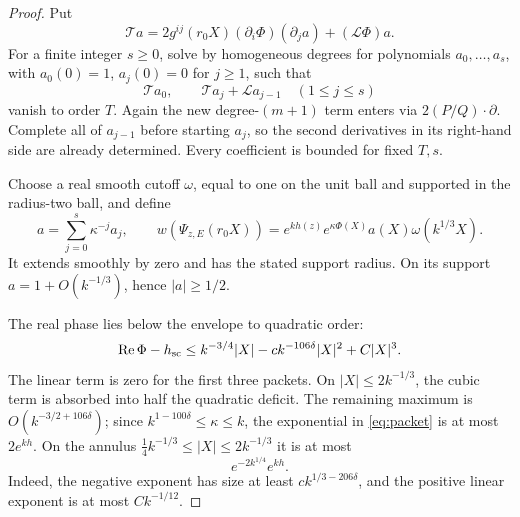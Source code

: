 \begin{proof}
Put
\[
 \mathcal T a=2g^{ij}(r_0X)(\partial_i\Phi)(\partial_j a)
                          +(\mathcal L\Phi)a.
\]
For a finite integer \(s\ge0\), solve by homogeneous degrees for
polynomials \(a_0,\ldots,a_s\), with \(a_0(0)=1\), \(a_j(0)=0\)
for \(j\ge1\), such that
\[
 \mathcal T a_0,\qquad
 \mathcal T a_j+\mathcal L a_{j-1}\quad(1\le j\le s)
\]
vanish to order \(T\).
Again the new degree-\((m+1)\) term enters via
\(2(P/Q)\cdot\partial\). Complete all of \(a_{j-1}\) before
starting \(a_j\), so the second derivatives in its right-hand side
are already determined. Every coefficient is bounded for fixed \(T,s\).

Choose a real smooth cutoff \(\omega\), equal to one on the unit
ball and supported in the radius-two ball, and define
\begin{equation}\label{eq:packet}
 a=\sum_{j=0}^s\kappa^{-j}a_j,\qquad
 w(\Psi_{z,E}(r_0X))=
 e^{kh(z)}e^{\kappa\Phi(X)}a(X)\omega(k^{1/3}X).
\end{equation}
It extends smoothly by zero and has the stated support radius.
On its support \(a=1+O(k^{-1/3})\), hence \(|a|\ge1/2\).

The real phase lies below the envelope to quadratic order:
\begin{equation}\label{eq:localization}
 \operatorname{Re}\Phi-h_{\rm sc}
 \le k^{-3/4}|X|-c k^{-106\delta}|X|^2+C|X|^3 .
\end{equation}
The linear term is zero for the first three packets. On
\(|X|\le2k^{-1/3}\), the cubic term is absorbed into half the
quadratic deficit. The remaining maximum is
\(O(k^{-3/2+106\delta})\); since
\(k^{1-100\delta}\le\kappa\le k\), the exponential in
\eqref{eq:packet} is at most \(2e^{kh}\).
On the annulus \(\tfrac14k^{-1/3}\le|X|\le2k^{-1/3}\)
it is at most
\begin{equation}\label{eq:tail}
 e^{-2k^{1/4}}e^{kh}.
\end{equation}
Indeed, the negative exponent has size at least
\(ck^{1/3-206\delta}\), and the positive linear exponent is
at most \(Ck^{-1/12}\).


\end{proof}
